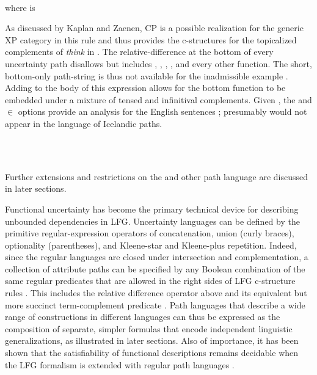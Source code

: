 \documentclass[output=paper,hidelinks]{langscibook}
\begin{document}
\ea\label{rule5}
\\[.5ex]
          \small \hsp{8em} where  is \disj{\COMP, \XCOMP, \ADJ\ (\in)}\kstar [\GF--{\COMP}]
\z

\noindent As discussed by Kaplan and Zaenen, CP is a possible realization for the generic XP category in this rule and thus provides the c-structures for the topicalized complements of \textit{think} in .   The relative-difference \attr{[gf--comp]} at the bottom of every uncertainty path disallows \COMP but includes  \OBJ, \SUBJ, \OBLTHETA, \ADJ, and every other function.  The short, bottom-only path-string \COMP is thus not available for the inadmissible example . Adding \XCOMP to the body of this expression allows for the bottom function to be embedded under a mixture of tensed and infinitival complements.  Given , the \ADJ and $\in$ options provide an analysis for the English sentences  \citep[examples from][]{dalrymple01}; presumably \ADJ would not appear in the language of Icelandic paths.

\ea\label{untensedadj}
 \\
 \\
\z\z

\noindent Further extensions and restrictions on the  and other path language are discussed in later sections. 

Functional uncertainty has become the primary technical device for describing unbounded dependencies in LFG. Uncertainty languages can be defined by the primitive regular-expression operators of concatenation, union (curly braces), optionality (parentheses), and Kleene-star and Kleene-plus repetition. Indeed, since the regular languages are closed under intersection and complementation, a collection of attribute paths can be specified by any Boolean combination of the same regular predicates that are allowed in the right sides of LFG c-structure rules \citep[see][]{kaplanmaxwell96,xledoc}.  This includes the relative difference  operator \attr{[gf--comp]} above and its equivalent but more succinct term-complement predicate . Path languages that describe a wide range of constructions in different languages can thus be expressed as the composition of separate, simpler formulas that encode independent linguistic generalizations, as illustrated in later sections. Also of importance, it has been shown that the satisfiability of functional descriptions remains decidable when the LFG formalism is extended with regular path languages \citep[e.g.][]{KaplanMaxwell1988:Uncertainty,backofen-1993-decidability}.
\end{document}

